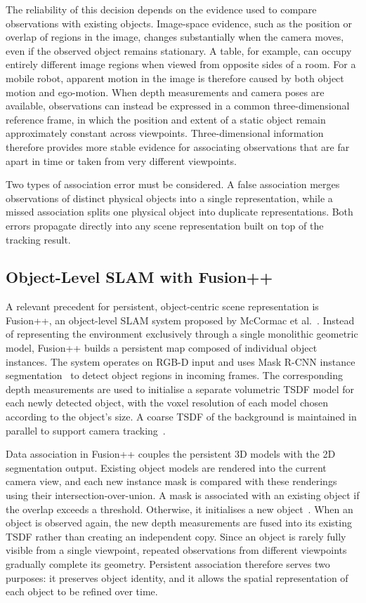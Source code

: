 {{{The reliability of this decision depends on the evidence used to compare observations with existing objects. Image-space evidence, such as the position or overlap of regions in the image, changes substantially when the camera moves, even if the observed object remains stationary. A table, for example, can occupy entirely different image regions when viewed from opposite sides of a room. For a mobile robot, apparent motion in the image is therefore caused by both object motion and ego-motion. When depth measurements and camera poses are available, observations can instead be expressed in a common three-dimensional reference frame, in which the position and extent of a static object remain approximately constant across viewpoints. Three-dimensional information therefore provides more stable evidence for associating observations that are far apart in time or taken from very different viewpoints.

Two types of association error must be considered. A false association merges observations of distinct physical objects into a single representation, while a missed association splits one physical object into duplicate representations. Both errors propagate directly into any scene representation built on top of the tracking result.
}
\subsection{Object-Level SLAM with Fusion++}
\label{subsec:fusionpp}
{\small
A relevant precedent for persistent, object-centric scene representation is Fusion++, an object-level SLAM system proposed by McCormac et al.~\cite{mccormac2018fusion}. Instead of representing the environment exclusively through a single monolithic geometric model, Fusion++ builds a persistent map composed of individual object instances. The system operates on RGB-D input and uses Mask R-CNN instance segmentation~\cite{he2017maskrcnn} to detect object regions in incoming frames. The corresponding depth measurements are used to initialise a separate volumetric TSDF model for each newly detected object, with the voxel resolution of each model chosen according to the object's size. A coarse TSDF of the background is maintained in parallel to support camera tracking~\cite{mccormac2018fusion}.

Data association in Fusion++ couples the persistent 3D models with the 2D segmentation output. Existing object models are rendered into the current camera view, and each new instance mask is compared with these renderings using their intersection-over-union. A mask is associated with an existing object if the overlap exceeds a threshold. Otherwise, it initialises a new object~\cite{mccormac2018fusion}. When an object is observed again, the new depth measurements are fused into its existing TSDF rather than creating an independent copy. Since an object is rarely fully visible from a single viewpoint, repeated observations from different viewpoints gradually complete its geometry. Persistent association therefore serves two purposes: it preserves object identity, and it allows the spatial representation of each object to be refined over time.

}}}
